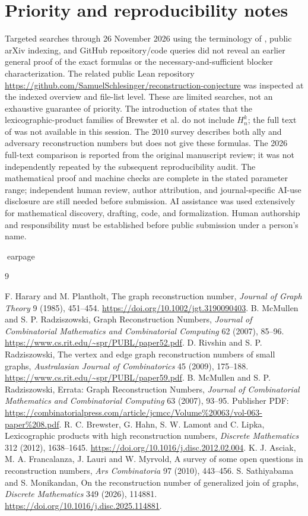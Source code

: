 \documentclass[11pt]{article}
\begin{document}
\section{Priority and reproducibility notes}
Targeted searches through 26 November 2026 using the terminology of \cite{HP,MR,RR,SM}, public arXiv indexing, and GitHub repository/code queries did not reveal an earlier general proof of the exact formulas or the necessary-and-sufficient blocker characterization. The related public Lean repository \url{https://github.com/SamuelSchlesinger/reconstruction-conjecture} was inspected at the indexed overview and file-list level. These are limited searches, not an exhaustive guarantee of priority. The introduction of \cite{SM} states that the lexicographic-product families of Brewster et al. \cite{Brewster} do not include $H_n^k$; the full text of \cite{Brewster} was not available in this session. The 2010 survey \cite{Survey} describes both ally and adversary reconstruction numbers but does not give these formulas. The 2026 full-text comparison is reported from the original manuscript review; it was not independently repeated by the subsequent reproducibility audit. The mathematical proof and machine checks are complete in the stated parameter range; independent human review, author attribution, and journal-specific AI-use disclosure are still needed before submission. AI assistance was used extensively for mathematical discovery, drafting, code, and formalization. Human authorship and responsibility must be established before public submission under a person's name.

earpage
\clearpage
\begin{thebibliography}{9}\raggedright
{} F. Harary and M. Plantholt, The graph reconstruction number, \emph{Journal of Graph Theory} 9 (1985), 451--454. \url{https://doi.org/10.1002/jgt.3190090403}.
 B. McMullen and S. P. Radziszowski, Graph Reconstruction Numbers, \emph{Journal of Combinatorial Mathematics and Combinatorial Computing} 62 (2007), 85--96. \url{https://www.cs.rit.edu/~spr/PUBL/paper52.pdf}.
 D. Rivshin and S. P. Radziszowski, The vertex and edge graph reconstruction numbers of small graphs, \emph{Australasian Journal of Combinatorics} 45 (2009), 175--188. \url{https://www.cs.rit.edu/~spr/PUBL/paper59.pdf}.
 B. McMullen and S. P. Radziszowski, Errata: Graph Reconstruction Numbers, \emph{Journal of Combinatorial Mathematics and Combinatorial Computing} 63 (2007), 93--95. Publisher PDF: \url{https://combinatorialpress.com/article/jcmcc/Volume\%20063/vol-063-paper\%208.pdf}.
 R. C. Brewster, G. Hahn, S. W. Lamont and C. Lipka, Lexicographic products with high reconstruction numbers, \emph{Discrete Mathematics} 312 (2012), 1638--1645. \url{https://doi.org/10.1016/j.disc.2012.02.004}.
 K. J. Asciak, M. A. Francalanza, J. Lauri and W. Myrvold, A survey of some open questions in reconstruction numbers, \emph{Ars Combinatoria} 97 (2010), 443--456.
 S. Sathiyabama and S. Monikandan, On the reconstruction number of generalized join of graphs, \emph{Discrete Mathematics} 349 (2026), 114881. \url{https://doi.org/10.1016/j.disc.2025.114881}.
\end{thebibliography}
\end{document}
